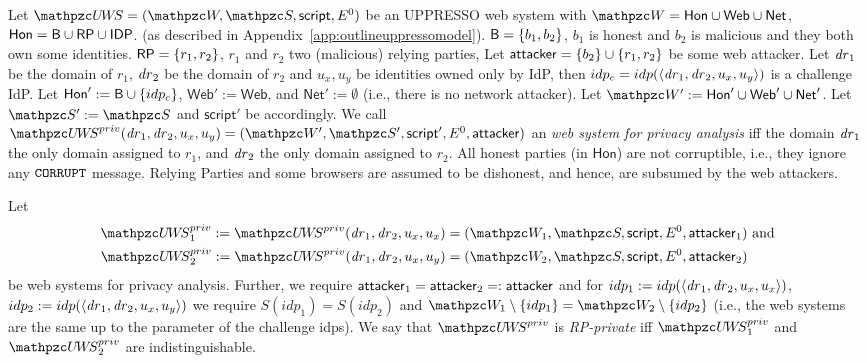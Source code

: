   \begin{definition}\label{def:uppresso-ws-priv}
    Let $\uppressowebsystem = (\bidsystem, \scriptset, 
    \mathsf{script}, E^0)$ be an UPPRESSO web system with 
    $\bidsystem = \mathsf{Hon} \cup \mathsf{Web} \cup 
    \mathsf{Net}$, 
    $\mathsf{Hon} = \mathsf{B} \cup \mathsf{RP} \cup \mathsf{IDP}$.
    (as described in Appendix~\ref{app:outlineuppressomodel}).
    $\mathsf{B} = \{b_1,b_2\}$, $b_1$ is honest and $b_2$ is 
    malicious and they both own some identities. 
    $\mathsf{RP} = \{r_1,r_2\}$, $r_1$ and $r_2$ two (malicious) 
    relying parties, 
    Let $\mathsf{attacker} = \{b_2\} \cup \{r_1,r_2\}$ be some 
    web attacker.
    Let $\mathit{dr}_1$ be the domain of $r_1$, $\mathit{dr}_2$ be the 
    domain of $r_2$ and $u_x, u_y$ be identities owned only by
    IdP, then $idp_c = idp(\langle {{}\mathit{dr}_1, \mathit{dr}_2, 
    u_x, u_y} \rangle)$ is a challenge IdP. 
    Let $\mathsf{Hon}' := \mathsf{B} \cup \{idp_c\}$, 
    $\mathsf{Web}' := \mathsf{Web}$, 
    and $\mathsf{Net}' := \emptyset$ 
    (i.e., there is no network attacker).
    Let $\bidsystem' := \mathsf{Hon}' \cup \mathsf{Web}' \cup 
    \mathsf{Net}'$. 
    Let $\scriptset' := \scriptset$ and $\mathsf{script}'$ be accordingly.
    We call $\uppressoprivwebsystem(\mi{dr}_1, \mi{dr}_2, 
    u_x, u_y) = (\bidsystem', \scriptset', \mathsf{script}', 
    E^0, \fAP{attacker})$ an \emph{\uppresso web system for 
    privacy analysis} 
    iff the domain $\mathit{dr}_1$ the only domain assigned to 
    $r_1$, and $\mathit{dr}_2$ the only domain assigned to $r_2$. 
    All honest parties (in $\mathsf{Hon}$) are not corruptible, 
    i.e., they ignore any $\mathtt{CORRUPT}$ message. Relying 
    Parties and some browsers are assumed to be dishonest, 
    and hence, are subsumed by the web attackers.
  \end{definition}
  
  \begin{definition}[RP-Privacy]\label{def:rp-privacy}
    Let 
    \begin{align*}
      \uppressoprivwebsystem_1 := \uppressoprivwebsystem(\mi{dr}_1, \mi{dr}_2, u_x, u_x) =
      (\bidsystem_1, \scriptset, \mathsf{script}, E^0, \fAP{attacker}_1)&\text{ and}\\
      \uppressoprivwebsystem_2 := \uppressoprivwebsystem(\mi{dr}_1, \mi{dr}_2, u_x, u_y) =
      (\bidsystem_2, \scriptset, \mathsf{script}, E^0, \fAP{attacker}_2)&
    \end{align*}
    be \uppresso web systems for privacy analysis.  Further, we 
    require $\mathsf{attacker}_1 = \mathsf{attacker}_2 =: 
    \mathsf{attacker}$ and for 
    $idp_1 := idp(\langle {{}\mathit{dr}_1, \mathit{dr}_2, u_x, u_x} \rangle)$, 
    $idp_2 := idp(\langle {{}\mathit{dr}_1, \mathit{dr}_2, u_x, u_y} \rangle)$ 
    we require $S(idp_1) = S(idp_2)$ and 
    $\bidsystem_1 \setminus \{idp_1\} = \bidsystem_2 \setminus \{idp_2\}$ 
    (i.e., the web systems are the same up to the parameter of
    the challenge idps).  
    We say that $\uppressoprivwebsystem$ is \emph{RP-private} 
    iff $\uppressoprivwebsystem_1$ and 
    $\uppressoprivwebsystem_2$ are indistinguishable.
  \end{definition}
  
